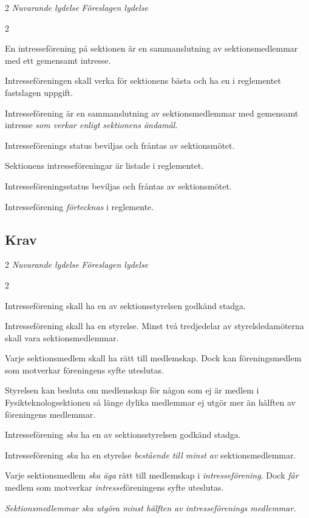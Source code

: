 \documentclass{article}
\newenvironment{lydelse}
    {\begin{paracol}{2}%
        \emph{Nuvarande lydelse}%
        \switchcolumn%
        \emph{Föreslagen lydelse}%
    \end{paracol}%
    \begin{enumerate}[label=\thesubsection.\arabic*]%
    \begin{paracol}{2}%
    }{\end{paracol}\end{enumerate}}
\begin{document}
\begin{lydelse}
  \setcounter{section}{12}
  \setcounter{subsection}{1}
  \item En intresseförening på sektionen är en sammanslutning av sektionsmedlemmar med ett gemensamt intresse.
  \item Intresseföreningen skall verka för sektionens bästa och ha en i reglementet fastslagen uppgift.
\switchcolumn
  \setcounter{section}{11}
  \item Intresseförening är en sammanslutning av sektionsmedlemmar med gemensamt intresse \emph{som verkar enligt sektionens ändamål}.
\switchcolumn*
  \setcounter{subsection}{3}
  \setcounter{enumi}{0}
  \item Intresseförenings status beviljas och fråntas av sektionsmötet.
  
  \setcounter{subsection}{8}
  \setcounter{enumi}{0}
  \item Sektionens intresseföreningar är listade i reglementet.
\switchcolumn
  \item Intresseföreningsstatus beviljas och fråntas av sektionsmötet.
  \item Intresseförening \emph{förtecknas} i reglemente.
\end{lydelse}
\setcounter{section}{11}
\setcounter{subsection}{0}

\subsection{Krav}
\begin{lydelse}
  \setcounter{section}{12}
  \setcounter{subsection}{2}
  \item Intresseförening skall ha en av sektionsstyrelsen godkänd stadga.
  \item Intresseförening skall ha en styrelse. Minst två tredjedelar av styrelsledamöterna skall vara sektionsmedlemmar.
  \setcounter{subsection}{7}
  \item Varje sektionsmedlem skall ha rätt till medlemskap. Dock kan föreningsmedlem som motverkar föreningens syfte uteslutas.
  \item Styrelsen kan besluta om medlemskap för någon som ej är medlem i Fysikteknologsektionen så länge dylika medlemmar ej utgör mer än hälften av föreningens medlemmar.
  \switchcolumn
  \setcounter{section}{11}
  \item Intresseförening \emph{ska} ha en av sektionsstyrelsen godkänd stadga.
  \item Intresseförening \emph{ska} ha en styrelse \emph{bestående till minst  av} sektionsmedlemmar.
  \item Varje sektionsmedlem \emph{ska äga} rätt till medlemskap i \emph{intresseförening}.
    Dock \emph{får} medlem som motverkar \emph{intresse}föreningens syfte uteslutas.
  \item \emph{Sektionsmedlemmar ska utgöra minst hälften av intresseförenings medlemmar.}
\end{lydelse}
\setcounter{section}{11}
\setcounter{subsection}{1}
\end{document}

